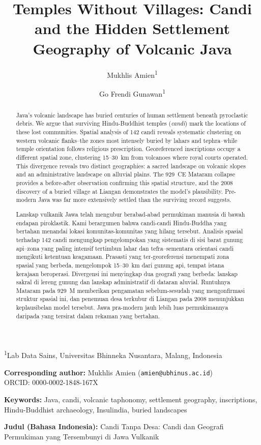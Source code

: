 \documentclass[12pt,a4paper]{article}
\title{Temples Without Villages: Candi and the Hidden Settlement Geography of Volcanic Java}
\author{Mukhlis Amien\textsuperscript{1} \and Go Frendi Gunawan\textsuperscript{1}}
\date{}
\begin{document}
\maketitle

\noindent\textsuperscript{1}Lab Data Sains, Universitas Bhinneka Nusantara, Malang, Indonesia

\vspace{0.5em}
\noindent\textbf{Corresponding author:} Mukhlis Amien (\texttt{amien@ubhinus.ac.id})\\
\noindent ORCID: 0000-0002-1848-167X

\begin{abstract}
Java's volcanic landscape has buried centuries of human settlement beneath pyroclastic debris.
We argue that surviving Hindu-Buddhist temples (\emph{candi}) mark the locations of these lost communities.
Spatial analysis of 142 candi reveals systematic clustering on western volcanic flanks--the zones most intensely buried by lahars and tephra--while temple orientation follows religious prescription.
Georeferenced inscriptions occupy a different spatial zone, clustering 15--30~km from volcanoes where royal courts operated.
This divergence reveals two distinct geographies: a sacred landscape on volcanic slopes and an administrative landscape on alluvial plains.
The 929~CE Mataram collapse provides a before-after observation confirming this spatial structure, and the 2008 discovery of a buried village at Liangan demonstrates the model's plausibility.
Pre-modern Java was far more extensively settled than the surviving record suggests.
\end{abstract}

\vspace{0.5em}
\noindent\textbf{Keywords:} Java, candi, volcanic taphonomy, settlement geography, inscriptions, Hindu-Buddhist archaeology, Insulindia, buried landscapes

\vspace{1em}
\noindent\textbf{Judul (Bahasa Indonesia):} Candi Tanpa Desa: Candi dan Geografi Permukiman yang Tersembunyi di Jawa Vulkanik

\vspace{0.5em}
\begin{abstract}
Lanskap vulkanik Jawa telah mengubur berabad-abad permukiman manusia di bawah endapan piroklastik. Kami berargumen bahwa candi-candi Hindu-Buddha yang bertahan menandai lokasi komunitas-komunitas yang hilang tersebut. Analisis spasial terhadap 142 candi mengungkap pengelompokan yang sistematis di sisi barat gunung api--zona yang paling intensif tertimbun lahar dan tefra--sementara orientasi candi mengikuti ketentuan keagamaan. Prasasti yang ter-georeferensi menempati zona spasial yang berbeda, mengelompok 15--30~km dari gunung api, tempat istana kerajaan beroperasi. Divergensi ini menyingkap dua geografi yang berbeda: lanskap sakral di lereng gunung dan lanskap administratif di dataran aluvial. Runtuhnya Mataram pada 929~M memberikan pengamatan sebelum-sesudah yang mengonfirmasi struktur spasial ini, dan penemuan desa terkubur di Liangan pada 2008 menunjukkan keplausibelan model tersebut. Jawa pra-modern jauh lebih luas permukimannya daripada yang tersirat dalam rekaman yang bertahan.
\end{abstract}
\end{document}
